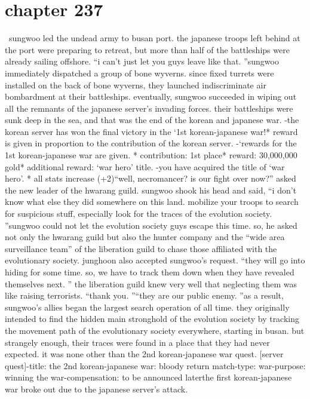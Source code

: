 \section{chapter 237}






 sungwoo led the undead army to busan port.
 the japanese troops left behind at the port were preparing to retreat, but more than half of the battleships were already sailing offshore.
“i can’t just let you guys leave like that.
”sungwoo immediately dispatched a group of bone wyverns.
since fixed turrets were installed on the back of bone wyverns, they launched indiscriminate air bombardment at their battleships.
eventually, sungwoo succeeded in wiping out all the remnants of the japanese server’s invading forces.
their battleships were sunk deep in the sea, and that was the end of the korean and japanese war.
-the korean server has won the final victory in the ‘1st korean-japanese war!* reward is given in proportion to the contribution of the korean server.
-‘rewards for the 1st korean-japanese war are given.
* contribution: 1st place* reward: 30,000,000 gold* additional reward: ‘war hero’ title.
-you have acquired the title of ‘war hero’.
* all stats increase (+2)“well, necromancer? is our fight over now?” asked the new leader of the hwarang guild.
 sungwoo shook his head and said, “i don’t know what else they did somewhere on this land.
 mobilize your troops to search for suspicious stuff, especially look for the traces of the evolution society.
”sungwoo could not let the evolution society guys escape this time.
 so, he asked not only the hwarang guild but also the hunter company and the “wide area surveillance team” of the liberation guild to chase those affiliated with the evolutionary society.
 junghoon also accepted sungwoo’s request.
“they will go into hiding for some time.
 so, we have to track them down when they have revealed themselves next.
”
the liberation guild knew very well that neglecting them was like raising terrorists.
“thank you.
”“they are our public enemy.
”as a result, sungwoo’s allies began the largest search operation of all time.
 they originally intended to find the hidden main stronghold of the evolution society by tracking the movement path of the evolutionary society everywhere, starting in busan.
but strangely enough, their traces were found in a place that they had never expected.
it was none other than the 2nd korean-japanese war quest.
[server quest]-title: the 2nd korean-japanese war: bloody return match-type: war-purpose: winning the war-compensation: to be announced laterthe first korean-japanese war broke out due to the japanese server’s attack.
